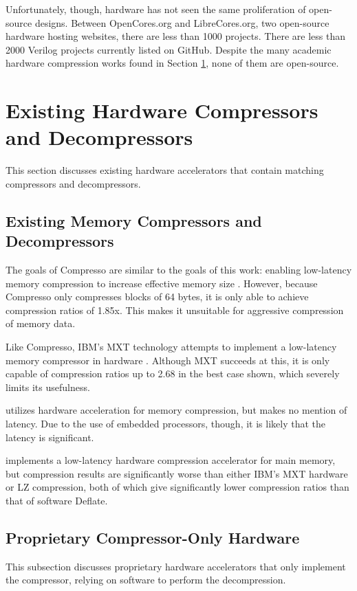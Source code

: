 \documentclass[doublespace,nopageskip]{VTthesis}
\begin{document}
Unfortunately, though, hardware has not seen the same proliferation of open-source designs. Between OpenCores.org and LibreCores.org, two open-source hardware hosting websites, there are less than 1000 projects. There are less than 2000 Verilog projects currently listed on GitHub. Despite the many academic hardware compression works found in Section \ref{se:existing_hardware_compressors_and_decompressors}, none of them are open-source.

\section{Existing Hardware Compressors and Decompressors}\label{se:existing_hardware_compressors_and_decompressors}
This section discusses existing hardware accelerators that contain matching compressors and decompressors.

\subsection{Existing Memory Compressors and Decompressors}\label{ss:other_memory_compressors_and_decompressors}
The goals of Compresso are similar to the goals of this work: enabling low-latency memory compression to increase effective memory size \cite{compresso}. However, because Compresso only compresses blocks of 64 bytes, it is only able to achieve compression ratios of 1.85x. This makes it unsuitable for aggressive compression of memory data.

Like Compresso, IBM's MXT technology attempts to implement a low-latency memory compressor in hardware \cite{mxt}. Although MXT succeeds at this, it is only capable of compression ratios up to 2.68 in the best case shown, which severely limits its usefulness.

\cite{memorycompressionenergy} utilizes hardware acceleration for memory compression, but makes no mention of latency. Due to the use of embedded processors, though, it is likely that the latency is significant.

\cite{linearcompression} implements a low-latency hardware compression accelerator for main memory, but compression results are significantly worse than either IBM's MXT hardware or LZ compression, both of which give significantly lower compression ratios than that of software Deflate.

\subsection{Proprietary Compressor-Only Hardware}\label{proprietary_compressor-only_hardware}
This subsection discusses proprietary hardware accelerators that only implement the compressor, relying on software to perform the decompression.
\end{document}
